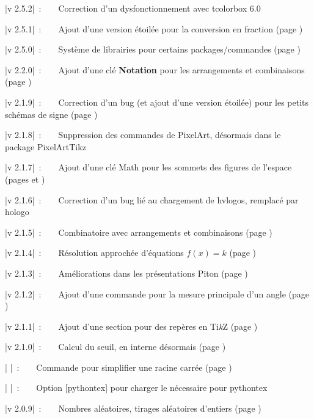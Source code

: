 \documentclass[a4paper,french,11pt]{article}
\providecommand\tikzlogo{Ti\textit{k}Z}
\let\TikZ\tikzlogo
\newcommand\Cle[1]{{\bfseries\sffamily\textlangle #1\textrangle}}
\begin{document}
{\small \bverb|v 2.5.2|~:~~~~Correction d'un dysfonctionnement avec \textsf{tcolorbox 6.0}

{\small \bverb|v 2.5.1|~:~~~~Ajout d'une version étoilée pour la conversion en fraction (page \pageref{convfrac})

{\small \bverb|v 2.5.0|~:~~~~Système de \textsf{librairies} pour certains packages/commandes (page \pageref{librairies})

{\small \bverb|v 2.2.0|~:~~~~Ajout d'une clé \Cle{Notation} pour les arrangements et combinaisons (page \pageref{combinatoire})

{\small \bverb|v 2.1.9|~:~~~~Correction d'un bug (et ajout d'une version étoilée) pour les petits schémas \og de signe \fg{} (page \pageref{aidesigne})

{\small \bverb|v 2.1.8|~:~~~~Suppression des commandes de PixelArt, désormais dans le package \textsf{PixelArtTikz}

{\small \bverb|v 2.1.7|~:~~~~Ajout d'une clé \textsf{Math} pour les sommets des figures de l'espace (pages \pageref{pave} et \pageref{tetra})

{\small \bverb|v 2.1.6|~:~~~~Correction d'un bug lié au chargement de \textsf{hvlogos}, remplacé par \textsf{hologo}

{\small \bverb|v 2.1.5|~:~~~~Combinatoire avec arrangements et combinaisons (page \pageref{combinatoire})

{\small \bverb|v 2.1.4|~:~~~~Résolution approchée d'équations $f(x)=k$ (page \pageref{resolapprox})

{\small \bverb|v 2.1.3|~:~~~~Améliorations dans les présentations \textsf{Piton} (page \pageref{pythonpiton})
	
{\small \bverb|v 2.1.2|~:~~~~Ajout d'une commande pour la mesure principale d'un angle (page \pageref{mesureprincipale})

{\small \bverb|v 2.1.1|~:~~~~Ajout d'une section pour des repères en \TikZ{} (page \pageref{reperagetikz})

{\small \bverb|v 2.1.0|~:~~~~Calcul du seuil, en interne désormais (page \pageref{calcrecurr})

{\small \bverb|       |~:~~~~Commande pour simplifier une racine carrée (page \pageref{simplracine})

{\small \bverb|       |~:~~~~Option \textsf{[pythontex]} pour charger le nécessaire pour \textsf{pythontex}
	
{\small \bverb|v 2.0.9|~:~~~~Nombres aléatoires, tirages aléatoires d'entiers (page \pageref{entiersaleatoires})

}}}}}}}}}}}}}}}}}
\end{document}
